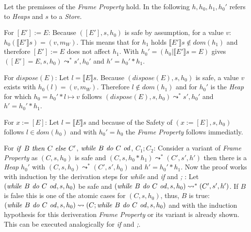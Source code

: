 	\begin{myproof}
		Let the premisses of the \emph{Frame Property} hold. In the following
		$h, h_0, h_1, h_0'$ refers to \emph{Heaps} and $s$ to a \emph{Store}.

		For $[E'] := E$: Because $([E'],s,h_0)$ is safe by assumption, for a value $v$:
		$h_0(\llbracket E'\rrbracket s) = (v,m_W)$. This means that for $h_1$
		holds $\llbracket E'\rrbracket s \notin \textit{dom}(h_1)$ and therefore
		$[E'] := E$ does not affect $h_1$. With $h_0' = (h_0|\llbracket E'\rrbracket s = E)$
		gives $([E'] = E,s,h_0)\leadsto^\ast s', h_0'$ and $h' = h_0'\ast h_1$.

		For $\textit{dispose}(E)$: Let $l = \llbracket E \rrbracket s$. Because
		$(\textit{dispose}(E),s,h_0)$ is safe, a value $v$ exists with 
		$h_0(l) = (v, m_W)$. Therefore $l \notin \textit{dom}(h_1)$ and for
		$h_0'$ is the \emph{Heap} for which $h_0 = h_0' \ast l\mapsto v$ follows
		$(\textit{dispose}(E),s,h_0)\leadsto^\ast s', h_0'$ and $h' = h_0'\ast h_1$.

		For $x := [E]$: Let $l = \llbracket E \rrbracket s$ and because of the
		Safety of $(x:=[E],s,h_0)$ follows $l\in\textit{dom}(h_0)$ and with
		$h_0' = h_0$ the \emph{Frame Property} follows immediatly.

		For $\text{\emph{if }}B\text{\emph{ then }} C\text{\emph{ else }} C'$,
		$\text{\emph{while }}B\text{\emph{ do }} C \text{\emph{ od}}$, $C_1;C_2$:
		Consider a variant of \emph{Frame Property} as $(C,s,h_0)$ is
		safe and $(C,s,h_0\ast h_1) \leadsto^\ast (C',s',h')$ then there is a
		\emph{Heap} $h_0'$ with $(C,s,h_0)\leadsto^\ast (C',s',h_0)$ and $h'=h_0'\ast h_1$.
		Now the proof works with induction by the derivation steps for \emph{while}
		and \emph{if} and \emph{;} :
		Let $(\text{\emph{while }} B \text{\emph{ do }} C \text{\emph{ od}},s,h_0)$
		be safe and $(\text{\emph{while }} B \text{\emph{ do }} C \text{\emph{ od}},s,h_0)
		\leadsto^\ast(C',s',h')$. If $B$ is false this is one of the atomic cases
		for $(C, s, h_0)$, thus, $B$ is true:
		$(\text{\emph{while }} B \text{\emph{ do }} C \text{\emph{ od}},s,h_0)\leadsto
		 (C;\text{\emph{while }} B \text{\emph{ do }} C \text{\emph{ od}},s,h_0)$
		 and with the induction hypothesis for this deriveration \emph{Frame Property}
		 or its variant is already shown. This can be executed
		 analogically for \emph{if} and \emph{;}.
	\end{myproof}

